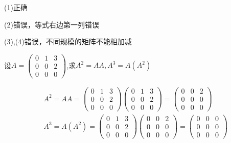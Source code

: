 \documentclass[a4paper]{report}
\begin{document}
\begin{jie}
(1)正确

(2)错误，等式右边第一列错误

(3),(4)错误，不同规模的矩阵不能相加减
\end{jie}

\EX 设$
A=
\begin{pmatrix}
0&1&3\\
0&0&2\\
0&0&0
\end{pmatrix}
$,求$A^2=AA,A^3=A(A^2)$

\begin{jie}
\begin{align*}
&A^2=AA=\begin{pmatrix}
0&1&3\\
0&0&2\\
0&0&0
\end{pmatrix}\begin{pmatrix}
0&1&3\\
0&0&2\\
0&0&0
\end{pmatrix}=\begin{pmatrix}
0&0&2\\
0&0&0\\
0&0&0
\end{pmatrix}\\
&A^3=A(A^2)=\begin{pmatrix}
0&1&3\\
0&0&2\\
0&0&0
\end{pmatrix}\begin{pmatrix}
0&0&2\\
0&0&0\\
0&0&0
\end{pmatrix}=\begin{pmatrix}
0&0&0\\
0&0&0\\
0&0&0
\end{pmatrix}
\end{align*}
\end{jie}
\end{document}
